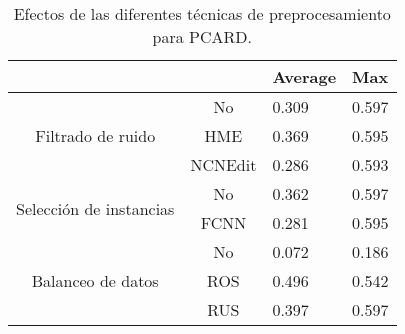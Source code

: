 \begin{table}[]
    \begin{tabular}{cc|l|l|}
    \cline{3-4}
    \multicolumn{1}{l}{\textbf{}}                                  & \textbf{} & \multicolumn{1}{c|}{\textbf{Average}} & \textbf{Max} \\ \hline
    \multicolumn{1}{|c|}{\multirow{3}{*}{Filtrado de ruido}}       & No        & 0.309                                 & 0.597        \\ \cline{2-4} 
    \multicolumn{1}{|c|}{}                                         & HME       & 0.369                                 & 0.595        \\ \cline{2-4} 
    \multicolumn{1}{|c|}{}                                         & NCNEdit   & 0.286                                 & 0.593        \\ \hline
    \multicolumn{1}{|c|}{\multirow{2}{*}{Selección de instancias}} & No        & 0.362                                 & 0.597        \\ \cline{2-4} 
    \multicolumn{1}{|c|}{}                                         & FCNN      & 0.281                                 & 0.595        \\ \hline
    \multicolumn{1}{|c|}{\multirow{3}{*}{Balanceo de datos}}       & No        & 0.072                                 & 0.186        \\ \cline{2-4} 
    \multicolumn{1}{|c|}{}                                         & ROS       & 0.496                                 & 0.542        \\ \cline{2-4} 
    \multicolumn{1}{|c|}{}                                         & RUS       & 0.397                                 & 0.597        \\ \hline
    \end{tabular}
    \caption{Efectos de las diferentes técnicas de preprocesamiento para PCARD.}
\end{table}
